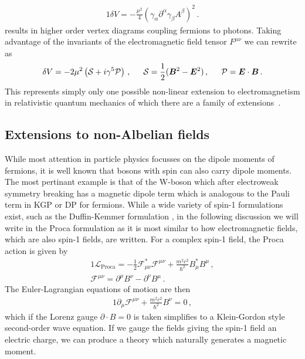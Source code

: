 \begin{alignat}{1}
    \label{eq:ext:03} \delta V=-\frac{\mu^{2}}{4}\left(\gamma_{\alpha}\partial^{\alpha}\gamma_{\beta}A^{\beta}\right)^{2}\,.
\end{alignat}
 results in higher order vertex diagrams coupling fermions to photons. Taking advantage of the invariants of the electromagnetic field tensor $F^{\mu\nu}$ we can rewrite  as
\begin{alignat}{1}
    \label{eq:ext:04a} \delta V=-2\mu^{2}\left(\mathcal{S}+i\gamma^{5}\mathcal{P}\right)\,,\indent\mathcal{S}=\frac{1}{2}(\bb{B}^{2}-\bb{E}^{2})\,,\indent \mathcal{P}=\bb{E}\cdot\bb{B}\,.
\end{alignat}
This represents simply only one possible non-linear extension to electromagnetism in relativistic quantum mechanics of which there are a family of extensions~\citep{Foldy:1952a}.

\subsection{Extensions to non-Albelian fields}
\label{sec:quarks}

While most attention in particle physics focusses on the dipole moments of fermions, it is well known that bosons with spin can also carry dipole moments. The most pertinant example is that of the W-boson which after electroweak symmetry breaking has a magnetic dipole term which is analogous to the Pauli term in KGP or DP for fermions. While a wide variety of spin-1 formulations exist, such as the Duffin-Kemmer formulation \ar, in the following discussion we will write in the Proca formulation as it is most similar to how electromagnetic fields, which are also spin-1 fields, are written. For a complex spin-1 field, the Proca action is given by
\begin{alignat}{1}
	\label{eq:proca:01a} \mathcal{L}_{\mathrm{Proca}} = -\frac{1}{2}\mathcal{F}_{\mu\nu}^{*}\mathcal{F}^{\mu\nu}+\frac{m^{2}c^{2}}{\hbar^{2}}B_{\mu}^{*}B^{\mu}\,,\\
	\label{eq:proca:01b} \mathcal{F}^{\mu\nu}=\partial^{\mu}B^{\nu}-\partial^{\nu}B^{\mu}\,.
\end{alignat}
The Euler-Lagrangian equations of motion are then
\begin{alignat}{1}
	\label{eq:proca:02a} \partial_{\mu}\mathcal{F}^{\mu\nu}+\frac{m^{2}c^{2}}{\hbar^{2}}B^{\nu}=0\,,
\end{alignat}
which if the Lorenz gauge $\partial\cdot B=0$ is taken simplifies to a Klein-Gordon style second-order wave equation. If we gauge the fields giving the spin-1 field an electric charge, we can produce a theory which naturally generates a magnetic moment.

